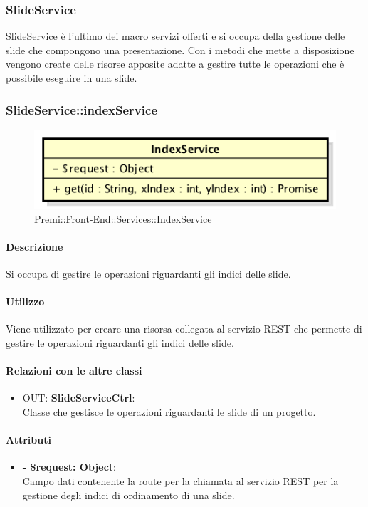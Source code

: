 \subsubsection{SlideService}
SlideService è l'ultimo dei macro servizi offerti e si occupa della gestione delle \gls{slide} che compongono una presentazione. Con i metodi che mette a disposizione vengono create delle risorse apposite adatte a gestire tutte le operazioni che è possibile eseguire in una \gls{slide}.


		\subsubsection{SlideService::indexService}
		\begin{figure}[h]
			\centering
				\includegraphics[width=0.4\linewidth]{img/premi_front_end_services_indexservice}
			\caption[Premi::Front-End::Services::IndexService]{Premi::Front-End::Services::IndexService}
		\end{figure}
		
		\paragraph{Descrizione}
		Si occupa di gestire le operazioni riguardanti gli indici delle \gls{slide}.
		
		\paragraph{Utilizzo}
		Viene utilizzato per creare una risorsa collegata al servizio \gls{REST} che permette di gestire le operazioni riguardanti gli indici delle \gls{slide}.
		
		\paragraph{Relazioni con le altre classi}
		\begin{itemize}
			\item OUT: \textbf{SlideServiceCtrl}:\\
			Classe che gestisce le operazioni riguardanti le \gls{slide} di un progetto.
		\end{itemize}
		
		\paragraph{Attributi}
		\begin{itemize}
			\item \textbf{- \$request: Object}:\\
			Campo dati contenente la route per la chiamata al servizio \gls{REST} per la gestione degli indici di ordinamento di una slide.
		\end{itemize}	
		
